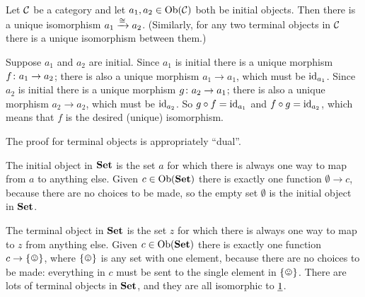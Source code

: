 \documentclass[CT4S-EN-RU]{subfiles}
\begin{document}
\begin{warningRUS}
\end{warningRUS}

\begin{propositionENG}\label{prop:initials are isomorphic}
Let $\mathcal{C}$ be a category and let $a_1,a_2\in\textnormal{Ob}(\mathcal{C})$ both be initial objects. Then there is a unique isomorphism $a_1\xrightarrow{\cong}a_2$. (Similarly, for any two terminal objects in $\mathcal{C}$ there is a unique isomorphism between them.) 
\end{propositionENG}

\begin{propositionRUS}\label{prop:initials are isomorphic}
\end{propositionRUS}

\begin{proofENG}
Suppose $a_1$ and $a_2$ are initial. Since $a_1$ is initial there is a unique morphism $f\colon a_1\rightarrow a_2$; there is also a unique morphism $a_1\to a_1$, which must be $\textnormal{id}_{a_1}$. Since $a_2$ is initial there is a unique morphism $g\colon a_2\rightarrow a_1$; there is also a unique morphism $a_2\to a_2$, which must be $\textnormal{id}_{a_2}$. So $g\circ f=\textnormal{id}_{a_1}$ and $f\circ g=\textnormal{id}_{a_2}$, which means that $f$ is the desired (unique) isomorphism.

The proof for terminal objects is appropriately “dual”.
\end{proofENG}

\begin{proofRUS}
\end{proofRUS}

\begin{exampleENG}\label{ex:universal obs in set}
The initial object in ${\mathbf{Set}}$ is the set $a$ for which there is always one way to map from $a$ to anything else. Given $c\in\textnormal{Ob}({\mathbf{Set}})$ there is exactly one function $\emptyset\to c$, because there are no choices to be made, so the empty set $\emptyset$ is the initial object in ${\mathbf{Set}}$.

The terminal object in ${\mathbf{Set}}$ is the set $z$ for which there is always one way to map to $z$ from anything else. Given $c\in\textnormal{Ob}({\mathbf{Set}})$ there is exactly one function $c\to\singleton$, where $\singleton$ is any set with one element, because there are no choices to be made: everything in $c$ must be sent to the single element in $\singleton$. There are lots of terminal objects in ${\mathbf{Set}}$, and they are all isomorphic to $\underline{1}$.
\end{exampleENG}
\end{document}
